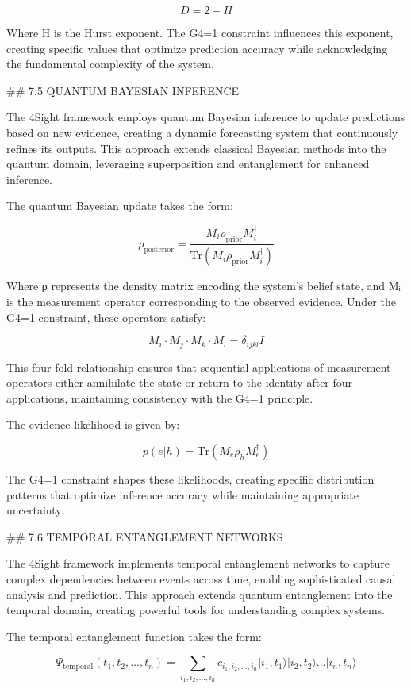 $$D = 2 - H$$

Where H is the Hurst exponent. The G4=1 constraint influences this exponent, creating specific values that optimize prediction accuracy while acknowledging the fundamental complexity of the system.

## 7.5 QUANTUM BAYESIAN INFERENCE

The 4Sight framework employs quantum Bayesian inference to update predictions based on new evidence, creating a dynamic forecasting system that continuously refines its outputs. This approach extends classical Bayesian methods into the quantum domain, leveraging superposition and entanglement for enhanced inference.

The quantum Bayesian update takes the form:

$$\rho_{\text{posterior}} = \frac{M_i \rho_{\text{prior}} M_i^{\dagger}}{\text{Tr}(M_i \rho_{\text{prior}} M_i^{\dagger})}$$

Where ρ represents the density matrix encoding the system's belief state, and Mᵢ is the measurement operator corresponding to the observed evidence. Under the G4=1 constraint, these operators satisfy:

$$M_i \cdot M_j \cdot M_k \cdot M_l = \delta_{ijkl} I$$

This four-fold relationship ensures that sequential applications of measurement operators either annihilate the state or return to the identity after four applications, maintaining consistency with the G4=1 principle.

The evidence likelihood is given by:

$$p(e|h) = \text{Tr}(M_e \rho_h M_e^{\dagger})$$

The G4=1 constraint shapes these likelihoods, creating specific distribution patterns that optimize inference accuracy while maintaining appropriate uncertainty.

## 7.6 TEMPORAL ENTANGLEMENT NETWORKS

The 4Sight framework implements temporal entanglement networks to capture complex dependencies between events across time, enabling sophisticated causal analysis and prediction. This approach extends quantum entanglement into the temporal domain, creating powerful tools for understanding complex systems.

The temporal entanglement function takes the form:

$$\Psi_{\text{temporal}}(t_1, t_2, ..., t_n) = \sum_{i_1, i_2, ..., i_n} c_{i_1, i_2, ..., i_n} |i_1, t_1\rangle |i_2, t_2\rangle ... |i_n, t_n\rangle$$

